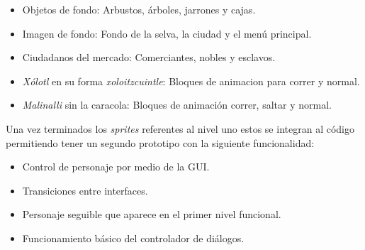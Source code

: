 \begin{itemize}
        \item Objetos de fondo: Arbustos, árboles, jarrones y cajas. 
        \item Imagen de fondo: Fondo de la selva, la ciudad y el menú principal. 
        \item Ciudadanos del mercado: Comerciantes, nobles y esclavos. 
        \item \textit{Xólotl} en su forma \textit{xoloitzcuintle}: Bloques de 
        animacion para correr y normal.
        \item \textit{Malinalli} sin la caracola: Bloques de animación correr, 
        saltar y normal.
\end{itemize}
Una vez terminados los \textit{sprites} referentes al nivel uno estos se integran al código 
permitiendo tener un segundo prototipo con la siguiente funcionalidad:
\begin{itemize}
        \item Control de personaje por medio de la GUI.
        \item Transiciones entre interfaces.
        \item Personaje seguible que aparece en el primer nivel funcional.
        \item Funcionamiento básico del controlador de diálogos.
\end{itemize}
